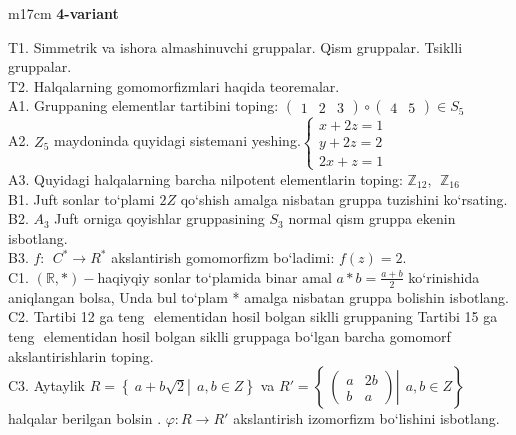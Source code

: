 \documentclass{article}
\begin{document}
\begin{tabular}{m{17cm}}
\textbf{4-variant}
\newline

T1. Simmetrik va ishora almashinuvchi gruppalar. Qism gruppalar. Tsiklli gruppalar. \\
T2. Halqalarning gomomorfizmlari haqida teoremalar. \\
A1. Gruppaning elementlar tartibini toping: \(\begin{pmatrix}
1 & 2 & 3
\end{pmatrix} \circ \begin{pmatrix}
4 & 5
\end{pmatrix} \in S_{5}\) \\
A2. \(Z_{5}\) maydoninda quyidagi sistemani yeshing.\(\left\{ \begin{matrix}
x + 2z = 1 \\
y + 2z = 2 \\
2x + z = 1
\end{matrix} \right.\ \) \\
A3. Quyidagi halqalarning barcha nilpotent elementlarin toping: \(\mathbb{Z}_{12},\ \ \mathbb{Z}_{16}\) \\
B1. Juft sonlar to`plami \(2Z\) qo`shish amalga nisbatan gruppa tuzishini ko`rsating. \\
B2. \(A_{3}\) Juft orniga qoyishlar gruppasining \(S_{3}\) normal qism gruppa ekenin isbotlang. \\
B3. \(f:\ \ C^{*} \rightarrow R^{*}\) akslantirish gomomorfizm bo`ladimi: \(f(z) = 2.\) \\
C1. \((\mathbb{R},*) -\)haqiyqiy sonlar to`plamida binar amal \(a*b = \frac{a + b}{2}\) ko`rinishida aniqlangan bolsa, Unda bul to`plam * amalga nisbatan gruppa bolishin isbotlang. \\
C2. Tartibi 12 ga teng \(< a >\) elementidan hosil bo\textquotesingle lgan siklli gruppaning Tartibi 15 ga teng \(< b >\) elementidan hosil bo\textquotesingle lgan siklli gruppaga bo`lgan barcha gomomorf akslantirishlarin toping. \\
C3. Aytaylik \(R = \left\{ \left. \ a + b\sqrt{2} \right|\ \ a,b \in Z \right\}\) va \(R' = \left\{ \left. \ \begin{pmatrix}
a & 2b \\
b & a
\end{pmatrix} \right|\ \ a,b \in Z \right\}\) halqalar berilgan bo\textquotesingle lsin . \(\varphi:R \rightarrow R'\) akslantirish izomorfizm bo`lishini isbotlang. \\

\end{tabular}
\vspace{1cm}
\end{document}
